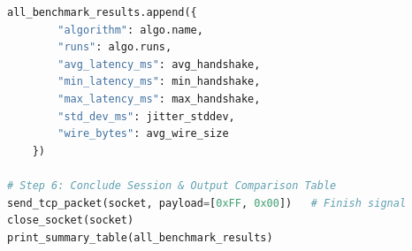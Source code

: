 \documentclass[11pt,a4paper]{article}
\begin{document}
\begin{lstlisting}[language=Python, caption={Phase B Network Benchmark Algorithm and Execution Flow}]
    all_benchmark_results.append({
        "algorithm": algo.name,
        "runs": algo.runs,
        "avg_latency_ms": avg_handshake,
        "min_latency_ms": min_handshake,
        "max_latency_ms": max_handshake,
        "std_dev_ms": jitter_stddev,
        "wire_bytes": avg_wire_size
    })

# Step 6: Conclude Session & Output Comparison Table
send_tcp_packet(socket, payload=[0xFF, 0x00])   # Finish signal
close_socket(socket)
print_summary_table(all_benchmark_results)
\end{lstlisting}
\end{document}
